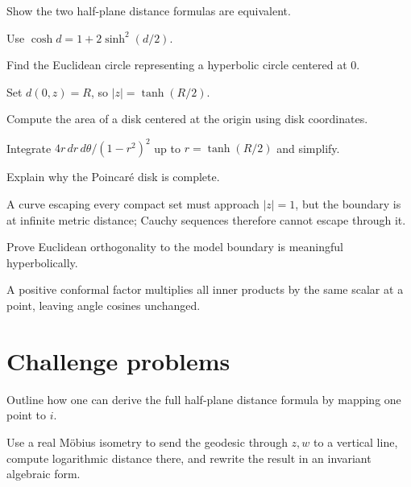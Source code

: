 \begin{problem}\label{prob:vii32-08}
Show the two half-plane distance formulas are equivalent.
\end{problem}
\begin{solution}
Use \(\cosh d=1+2\sinh^2(d/2)\).
\end{solution}

\begin{problem}\label{prob:vii32-09}
Find the Euclidean circle representing a hyperbolic circle centered at \(0\).
\end{problem}
\begin{solution}
Set \(d(0,z)=R\), so \(|z|=\tanh(R/2)\).
\end{solution}

\begin{problem}\label{prob:vii32-10}
Compute the area of a disk centered at the origin using disk coordinates.
\end{problem}
\begin{solution}
Integrate \(4r\,dr\,d\theta/(1-r^2)^2\) up to \(r=\tanh(R/2)\) and simplify.
\end{solution}

\begin{problem}\label{prob:vii32-11}
Explain why the Poincaré disk is complete.
\end{problem}
\begin{solution}
A curve escaping every compact set must approach \(|z|=1\), but the boundary is at infinite metric distance; Cauchy sequences therefore cannot escape through it.
\end{solution}

\begin{problem}\label{prob:vii32-12}
Prove Euclidean orthogonality to the model boundary is meaningful hyperbolically.
\end{problem}
\begin{solution}
A positive conformal factor multiplies all inner products by the same scalar at a point, leaving angle cosines unchanged.
\end{solution}

\section{Challenge problems}
\begin{problem}\label{prob:vii32-ch01}
Outline how one can derive the full half-plane distance formula by mapping one point to \(i\).
\end{problem}
\begin{solution}
Use a real Möbius isometry to send the geodesic through \(z,w\) to a vertical line, compute logarithmic distance there, and rewrite the result in an invariant algebraic form.
\end{solution}

